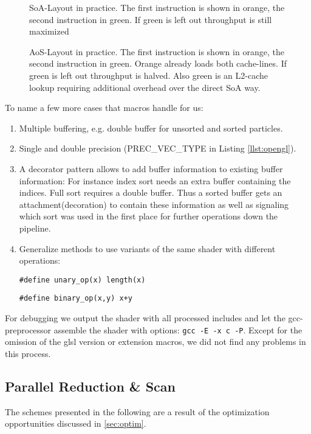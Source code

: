 \documentclass[m,times]{cgMA}
\begin{document}
\begin{figure}[htbp]
  \centering
  
  \caption{SoA-Layout in practice. The first instruction is shown in orange, the second instruction in green. If green is left out throughput is still maximized}
\label{fig:soa}
\end{figure}
\begin{figure}[htbp]  \centering
  
  \caption{AoS-Layout in practice. The first instruction is shown in orange, the second instruction in green. Orange already loads both cache-lines. If green is left out throughput is halved. Also green is an L2-cache lookup requiring additional overhead over the direct SoA way.}
\label{fig:aos}
\end{figure}

To name a few more cases that macros handle for us:
\begin{enumerate}
  \item Multiple buffering, e.g. double buffer for unsorted and sorted particles.
  \item Single and double precision (PREC\_VEC\_TYPE in Listing \ref{llst:opengl}).
  \item A decorator pattern allows to add buffer information to existing buffer information: For instance index sort needs an extra buffer containing the indices. Full sort requires a double buffer. Thus a sorted buffer gets an attachment(decoration) to contain these information as well as signaling which sort was used in the first place for further operations down the pipeline.
  \item Generalize methods to use variants of the same shader with different operations:

    \texttt{\#define unary\_op(x) length(x)}

    \texttt{\#define binary\_op(x,y) x+y}
\end{enumerate}
For debugging we output the shader with all processed includes and let the gcc-preprocessor assemble the shader with options: \texttt{gcc -E -x c -P}. Except for the omission of the glsl version or extension macros, we did not find any problems in this process.

\subsection{Parallel Reduction \& Scan} \label{sec:red_scan}
The schemes presented in the following are a result of the optimization opportunities discussed in \ref{sec:optim}.
\end{document}
